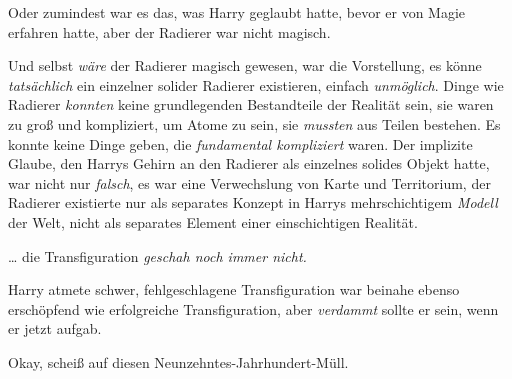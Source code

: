 Oder zumindest war es das, was Harry geglaubt hatte, bevor er von Magie erfahren hatte, aber der Radierer war nicht magisch.

Und selbst \emph{wäre} der Radierer magisch gewesen, war die Vorstellung, es könne \emph{tatsächlich} ein einzelner solider Radierer existieren, einfach \emph{unmöglich}. Dinge wie Radierer \emph{konnten} keine grundlegenden Bestandteile der Realität sein, sie waren zu groß und kompliziert, um Atome zu sein, sie \emph{mussten} aus Teilen bestehen. Es konnte keine Dinge geben, die \emph{fundamental kompliziert} waren. Der implizite Glaube, den Harrys Gehirn an den Radierer als einzelnes solides Objekt hatte, war nicht nur \emph{falsch}, es war eine Verwechslung von Karte und Territorium, der Radierer existierte nur als separates Konzept in Harrys mehrschichtigem \emph{Modell} der Welt, nicht als separates Element einer einschichtigen Realität.

… die Transfiguration \emph{geschah noch immer nicht.}

Harry atmete schwer, fehlgeschlagene Transfiguration war beinahe ebenso erschöpfend wie erfolgreiche Transfiguration, aber \emph{verdammt} sollte er sein, wenn er jetzt aufgab.

Okay, scheiß auf diesen Neunzehntes-Jahrhundert-Müll.

